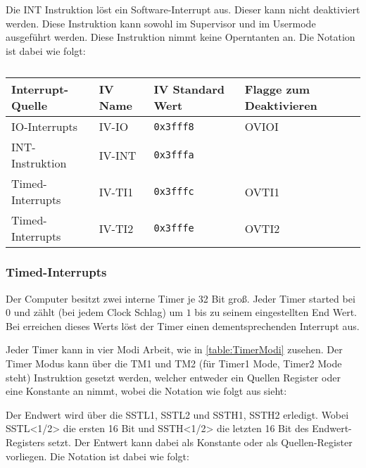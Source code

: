 \documentclass{scrartcl}
\begin{document}
Die INT Instruktion löst ein Software-Interrupt aus. Dieser kann nicht deaktiviert werden. Diese Instruktion kann sowohl im Supervisor und im Usermode ausgeführt werden. Diese Instruktion nimmt keine Operntanten an. Die Notation ist dabei wie folgt:


\begin{center}	
	\begin{table}[h]
		\caption{\label{table:iv}}
		\begin{tabular}{l | l l | l}
			Interrupt-Quelle & IV Name & IV Standard Wert & Flagge zum Deaktivieren \\
			\hline
			IO-Interrupts & IV-IO & \texttt{0x3fff8} & OVIOI \\
			INT-Instruktion & IV-INT & \texttt{0x3fffa} &  \\
			Timed-Interrupts & IV-TI1 & \texttt{0x3fffc} & OVTI1 \\
			Timed-Interrupts & IV-TI2 & \texttt{0x3fffe} & OVTI2
		\end{tabular}
	\end{table}
\end{center}

\subsubsection{Timed-Interrupts}

Der Computer besitzt zwei interne Timer je 32 Bit groß. Jeder Timer started bei $0$ und zählt (bei jedem Clock Schlag) um $1$ bis zu seinem eingestellten End Wert. Bei erreichen dieses Werts löst der Timer einen dementsprechenden Interrupt aus. 

Jeder Timer kann in vier Modi Arbeit, wie in \autoref{table:TimerModi} zusehen. Der Timer Modus kann über die TM1 und TM2 (für Timer1 Mode, Timer2 Mode steht) Instruktion gesetzt werden, welcher entweder ein Quellen Register oder eine Konstante an nimmt, wobei die Notation wie folgt aus sieht:


Der Endwert wird über die SSTL1, SSTL2 und SSTH1, SSTH2 erledigt. Wobei SSTL<1/2> die ersten 16 Bit und SSTH<1/2> die letzten 16 Bit des Endwert-Registers setzt. Der Entwert kann dabei als Konstante oder als Quellen-Register vorliegen. Die Notation ist dabei wie folgt:


\end{document}
